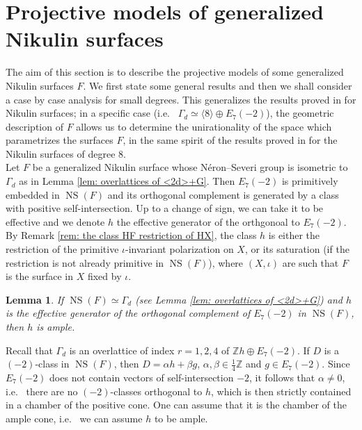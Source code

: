 \documentclass{amsart}
\newtheorem{lemma}[thm]{Lemma}
\theoremstyle{definition}
\numberwithin{equation}{section}
\numberwithin{equation}{section} \theoremstyle{definition}
\DeclareMathOperator{\NS}{NS}
\newcommand\Z{\mathbb{Z}}
\newcommand\HK{hyper-K\"ahler}
\begin{document}
\section{Projective models of generalized Nikulin surfaces}\label{section:projective models}
The aim of this section is to describe the projective models of some generalized Nikulin surfaces $F$. %
We first state some general results and then we shall consider a case by case analysis for small degrees. This generalizes the results proved in \cite[Sections 3 and 4]{GS} for Nikulin surfaces; in a specific case (i.e.~ $\Gamma_d\simeq \langle 8\rangle\oplus E_7(-2)$), the geometric description of $F$ allows us to determine the unirationality of the space which parametrizes the surfaces $F$, in the same spirit of the results proved  in \cite{V} for the Nikulin surfaces of degree 8.\\ 

Let $F$ be a generalized Nikulin surface whose N\'eron--Severi group is isometric to $\Gamma_d$ as in Lemma \ref{lem: overlattices of <2d>+G}. Then $E_7(-2)$ is primitively embedded in $\NS(F)$ and its orthogonal complement is generated by a class with positive self-intersection. Up to a change of sign, we can take it to be effective and we denote $h$ the effective generator  of the orthgonoal to $E_7(-2)$. By Remark \ref{rem: the class HF restriction of HX}, the class $h$ is either the restriction of the primitive $\iota$-invariant polarization on $X$, or  its saturation (if the restriction is not already primitive in $\NS(F)$), where $(X,\iota)$ are such that $F$ is the surface in $X$ fixed by $\iota$.
\begin{lemma}\label{lemma: h ample} If $\NS(F)\simeq \Gamma_d$ (see Lemma \ref{lem: overlattices of <2d>+G}) and $h$ is the effective generator of the orthogonal complement of $E_7(-2)$ in $\NS(F)$, then $h$ is ample.\end{lemma}
\proof 
Recall that 
$\Gamma_d$ is an overlattice of index $r=1,2,4$ of $\Z h\oplus E_7(-2)$. If $D$ is a $(-2)$-class
in $\NS(F)$, then $D=\alpha h+\beta g$, $\alpha,\beta\in\frac{1}{4}\mathbb{Z}$ and $g\in E_7(-2)$.
Since $E_7(-2)$ does not contain vectors of self-intersection $-2$, it follows that
$\alpha\neq 0$, i.e.~ there are no $(-2)$-classes orthogonal to $h$, which is then
strictly contained in a chamber of the positive cone. One can assume that it is the
chamber of the ample cone, i.e.~ we can assume $h$ to be ample.
\endproof
\end{document}
